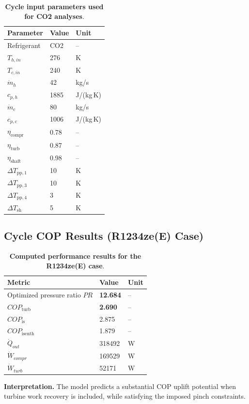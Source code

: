 \begin{table}[h!]
\centering
\caption{\textbf{Cycle input parameters used for CO2 analyses}.}
\begin{tabular}{lll}
\hline
\textbf{Parameter} & \textbf{Value} & \textbf{Unit} \\
\hline
Refrigerant & CO2 & -- \\
$T_{h,in}$ & 276 & K \\
$T_{c,in}$ & 240 & K \\
$\dot m_h$ & 42 & kg/s \\
$c_{p,h}$ & 1885 & J/(kg\,K) \\
$\dot m_c$ & 80 & kg/s \\
$c_{p,c}$ & 1006 & J/(kg\,K) \\
$\eta_{\mathrm{compr}}$ & 0.78 & -- \\
$\eta_{\mathrm{turb}}$ & 0.87 & -- \\
$\eta_{\mathrm{shaft}}$ & 0.98 & -- \\
$\Delta T_{\mathrm{pp},1}$ & 10 & K \\
$\Delta T_{\mathrm{pp},3}$ & 10 & K \\
$\Delta T_{\mathrm{pp},4}$ & 3 & K \\
$\Delta T_{\mathrm{sh}}$ & 5 & K \\
\hline
\end{tabular}
\end{table}

\subsection{Cycle COP Results (R1234ze(E) Case)}

\begin{table}[h!]
\centering
\caption{\textbf{Computed performance results for the R1234ze(E) case}.}
\begin{tabular}{lll}
\hline
\textbf{Metric} & \textbf{Value} & \textbf{Unit} \\
\hline
Optimized pressure ratio $PR$ & \textbf{12.684} & -- \\
$COP_{\mathrm{turb}}$ & \textbf{2.690} & -- \\
$COP_{\mathrm{is}}$ & 2.875 & -- \\
$COP_{\mathrm{isenth}}$ & 1.879 & -- \\
$\dot Q_{out}$ & 318492 & W \\
$\dot W_{compr}$ & 169529 & W \\
$\dot W_{turb}$ & 52171 & W \\
\hline
\end{tabular}
\end{table}

\textbf{Interpretation.} The model predicts a substantial COP uplift potential when turbine work recovery is included, while satisfying the imposed pinch constraints.
